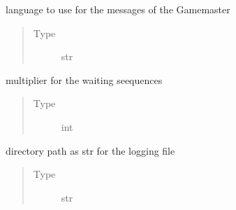 \documentclass[letterpaper,10pt,english]{sphinxmanual}
\begin{document}
\begin{fulllineitems}

\begin{fulllineitems}
\label{\detokenize{chatwolf:chatwolf.game.Game.lang}}
language to use for the messages of the Game\sphinxhyphen{}master
\begin{quote}\begin{description}
\item[{Type}] \leavevmode
str

\end{description}\end{quote}

\end{fulllineitems}


\begin{fulllineitems}
\label{\detokenize{chatwolf:chatwolf.game.Game.wait_mult}}
multiplier for the waiting seequences
\begin{quote}\begin{description}
\item[{Type}] \leavevmode
int

\end{description}\end{quote}

\end{fulllineitems}


\begin{fulllineitems}
\label{\detokenize{chatwolf:chatwolf.game.Game.log_dir}}
directory path as str for the logging file
\begin{quote}\begin{description}
\item[{Type}] \leavevmode
str

\end{description}\end{quote}

\end{fulllineitems}



\end{fulllineitems}
\end{document}
